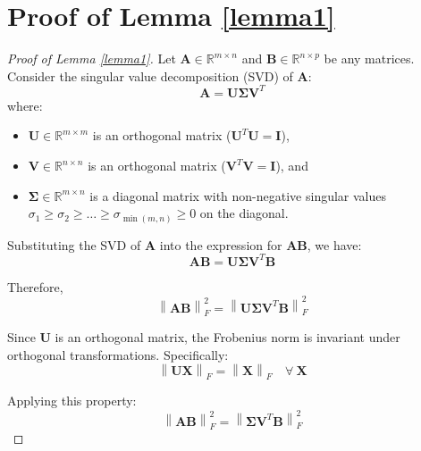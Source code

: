 \section{Proof of Lemma \ref{lemma1}}\label{sec:provelemma}
\begin{proof}[Proof of Lemma \ref{lemma1}]
Let \(\boldsymbol{A} \in \mathbb{R}^{m \times n}\) and \(\boldsymbol{B} \in \mathbb{R}^{n \times p}\) be any matrices. Consider the singular value decomposition (SVD) of \(\boldsymbol{A}\):
\begin{equation}
\boldsymbol{A} = \boldsymbol{U} \boldsymbol{\Sigma} \boldsymbol{V}^T
\end{equation}
where:
\begin{itemize}
    \item \(\boldsymbol{U} \in \mathbb{R}^{m \times m}\) is an orthogonal matrix (\(\boldsymbol{U}^T \boldsymbol{U} = \boldsymbol{I}\)),
    \item \(\boldsymbol{V} \in \mathbb{R}^{n \times n}\) is an orthogonal matrix (\(\boldsymbol{V}^T \boldsymbol{V} = \boldsymbol{I}\)), and
    \item \(\boldsymbol{\Sigma} \in \mathbb{R}^{m \times n}\) is a diagonal matrix with non-negative singular values \(\sigma_1 \geq \sigma_2 \geq \dots \geq \sigma_{\min(m,n)} \geq 0\) on the diagonal.
\end{itemize}


Substituting the SVD of \(\boldsymbol{A}\) into the expression for \(\boldsymbol{AB}\), we have:
\begin{equation}
\boldsymbol{AB} = \boldsymbol{U} \boldsymbol{\Sigma} \boldsymbol{V}^T \boldsymbol{B}
\end{equation}

Therefore,
\begin{equation}
\left\lVert \boldsymbol{AB} \right\rVert_F^2 = \left\lVert \boldsymbol{U} \boldsymbol{\Sigma} \boldsymbol{V}^T \boldsymbol{B} \right\rVert_F^2
\end{equation}

Since \(\boldsymbol{U}\) is an orthogonal matrix, the Frobenius norm is invariant under orthogonal transformations. Specifically:
\begin{equation}
\left\lVert \boldsymbol{U} \boldsymbol{X} \right\rVert_F = \left\lVert \boldsymbol{X} \right\rVert_F \quad \forall \ \boldsymbol{X}
\end{equation}

Applying this property:
\begin{equation}
\left\lVert \boldsymbol{AB} \right\rVert_F^2 = \left\lVert \boldsymbol{\Sigma} \boldsymbol{V}^T \boldsymbol{B} \right\rVert_F^2
\end{equation}


\end{proof}

